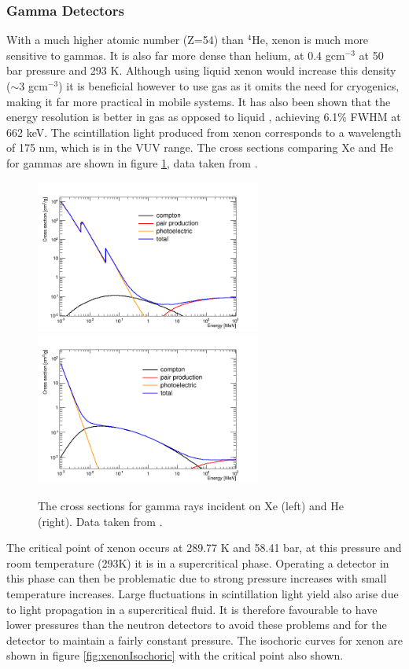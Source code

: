 \subsubsection{Gamma Detectors}
With a much higher atomic number (Z=54) than $^{4}$He, xenon is much more sensitive to gammas. It is also far more dense than helium, at 0.4 gcm$^{-3}$ at 50 bar pressure and 293 K. Although using liquid xenon would increase this density ($\sim$3 gcm$^{-3}$) it is beneficial however to use gas as it omits the need for cryogenics, making it far more practical in mobile systems. It has also been shown that the energy resolution is better in gas as opposed to liquid \cite{xenonDetectorsBolotnikov}, achieving 6.1\% FWHM at 662 keV. The scintillation light produced from xenon corresponds to a wavelength of 175 nm, which is in the VUV range. The cross sections comparing Xe and He for gammas are shown in figure \ref{fig:gammaXSecXeHe}, data taken from \cite{nistDatabase}.

\begin{figure}[htbp]
\begin{center}
\includegraphics[width=74mm]{Chapter5/figures/xenonGammaXSec.png}
\includegraphics[width=74mm]{Chapter5/figures/heliumGammaXSec.png}
\caption{The cross sections for gamma rays incident on Xe (left) and He (right). Data taken from \cite{nistDatabase}.}
\label{fig:gammaXSecXeHe}
\end{center}
\end{figure}

The critical point of xenon occurs at 289.77 K and 58.41 bar, at this pressure and room temperature (293K) it is in a supercritical phase. Operating a detector in this phase can then be problematic due to strong pressure increases with small temperature increases. Large fluctuations in scintillation light yield also arise due to light propagation in a supercritical fluid. It is therefore favourable to have lower pressures than the neutron detectors to avoid these problems and for the detector to maintain a fairly constant pressure. The isochoric curves for xenon are shown in figure \ref{fig:xenonIsochoric} with the critical point also shown. 

